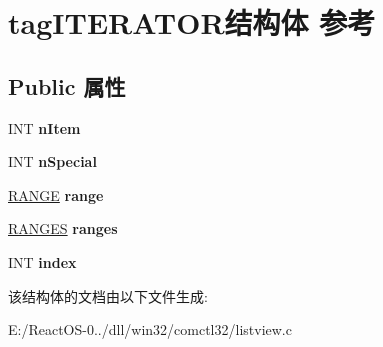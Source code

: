 \hypertarget{structtag_i_t_e_r_a_t_o_r}{}\section{tag\+I\+T\+E\+R\+A\+T\+O\+R结构体 参考}
\label{structtag_i_t_e_r_a_t_o_r}
\subsection*{Public 属性}
\begin{DoxyCompactItemize}
\item 
\mbox{\label{structtag_i_t_e_r_a_t_o_r_a02d01957e04f490c95458add6aac6e2b}} 
I\+NT {\bfseries n\+Item}
\item 
\mbox{\label{structtag_i_t_e_r_a_t_o_r_a8a367d7e53965fc1e8157f75388d1db9}} 
I\+NT {\bfseries n\+Special}
\item 
\mbox{\label{structtag_i_t_e_r_a_t_o_r_a5afdd9d40062b0c06ffd0a8b47b5ee56}} 
\hyperlink{structtag_r_a_n_g_e}{R\+A\+N\+GE} {\bfseries range}
\item 
\mbox{\label{structtag_i_t_e_r_a_t_o_r_a17d48e5a55d0141478dc2708b5bf5faf}} 
\hyperlink{structtag_r_a_n_g_e_s}{R\+A\+N\+G\+ES} {\bfseries ranges}
\item 
\mbox{\label{structtag_i_t_e_r_a_t_o_r_a2d06b5ea7741b6b47e7f1a4dd625b83b}} 
I\+NT {\bfseries index}
\end{DoxyCompactItemize}


该结构体的文档由以下文件生成\+:\begin{DoxyCompactItemize}
\item 
E\+:/\+React\+O\+S-\/0../dll/win32/comctl32/listview.\+c\end{DoxyCompactItemize}
